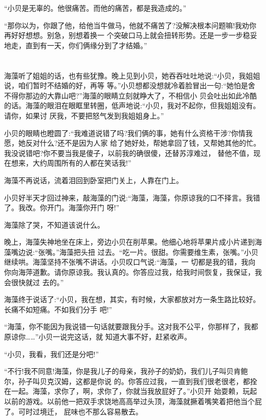 \documentclass[11pt,a4paper,onecolumn]{article}
\begin{document}
``小贝是无辜的。他很痛苦。而他的痛苦，都是我造成的。''

``那你以为，你跟了他，给他当牛做马，他就不痛苦了?没解决根本问题嘛!我劝你再好好想想。别急，别想着换一
个突破口马上就会扭转形势。还是一步一步稳妥地走，直到有一天，你们俩缘分到了才结婚。''

\section[\thesection]{}

海藻听了姐姐的话，也有些犹豫。晚上见到小贝，她吞吞吐吐地说:``小贝，我姐姐说，咱们暂时不结婚的好，再等
等。''小贝想都没想就冷着脸冒出一句:``她怕是舍不得你那边的大靠山吧?''海藻的眼睛立刻就睁大了，不相信小
贝会吐出如此冷酷的话。海藻的眼泪在眼眶里转圈，低声地说:``小贝，我对不起你，但我姐姐没有。请你，如果讨
厌我，不要把怒气发到我姐姐身上。''

小贝的眼睛也瞪圆了:``我难道说错了吗?我们俩的事，她有什么资格干涉?你情我愿，她反对什么?还不是因为人家
给了她好处，帮她拿回了钱，又帮她其他的忙。我没说错吧?你不要当我是傻子，以前我的确很傻，还替苏淳难过，
替他不值，现在想来，大约周围所有的人都在笑话我!''

海藻不再说话，流着泪回到卧室把门关上，人靠在门上。

小贝好半天才回过神来，敲海藻的门说:``海藻，海藻，你原谅我的口不择言。我错了。我改。你开门。海藻你开门
呀!''

海藻除了哭，不知道该说什么。

晚上，海藻失神地坐在床上，旁边小贝在削苹果。他细心地将苹果片成小片递到海藻嘴边说:``张嘴。''海藻把头扭
过去。``吃一片。很甜。你需要维生素，张嘴。''小贝继续哄。海藻坚持不张嘴不讲话。小贝叹口气说:``海藻，一
切都是我的错，我向你向海萍道歉。请你原谅我。我认真的。你答应过我，给我时间恢复，我保证，我会很快就过
去的。''

海藻终于说话了:``小贝，我在想，其实，有时候，大家都放对方一条生路比较好。长痛不如短痛。不如我们分手
吧!''

``海藻，你不能因为我说错一句话就要跟我分手。这对我不公平，你那样了，我都原谅你……''小贝一说完这话，就
知道大事不好，赶紧收声。

``小贝，我看，我们还是分吧!''

``不行!我不同意!海藻，你是我儿子的母亲，我孙子的奶奶，我们儿子叫贝肯鲍尔，孙子叫贝克汉姆，这都是你说
的。你答应过我，一直到我们很老很老，都拴在一起。海藻，求你了，啊，求你了，你就当我放屁好了。''小贝开
始耍赖，玩起以前的游戏。以前他一把双手求饶地高高举过头顶，海藻就撅着嘴笑着把他当个屁了。可时过境迁，
屁味也不那么容易散去。
\end{document}
